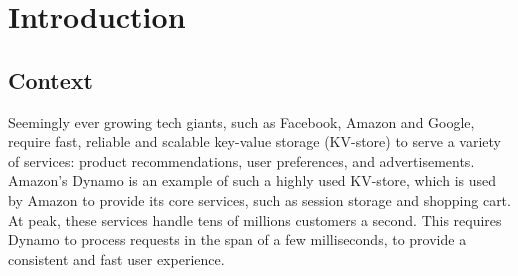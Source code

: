 

\chapter{Introduction}








\section{Context}
Seemingly ever growing tech giants, such as Facebook, Amazon and Google, require fast, reliable and scalable key-value storage (KV-store) to serve a variety of services: product recommendations, user preferences, and advertisements\cite{decandia2007dynamo,geambasu2010comet}.
Amazon's Dynamo is an example of such a highly used KV-store, which is used by Amazon to provide its core services, such as session storage and shopping cart\cite{decandia2007dynamo}.
At peak, these services handle tens of millions customers a second.
This requires Dynamo to process requests in the span of a few milliseconds, to provide a consistent and fast user experience.

